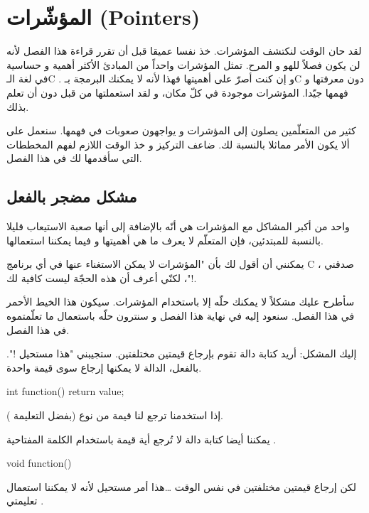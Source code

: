 \chapter{المؤشّرات (\textenglish{Pointers})}

لقد حان الوقت لنكتشف المؤشرات. خذ نفسا عميقا قبل أن تقرر قراءة هذا الفصل لأنه لن يكون فصلاً للهو و المرح. تمثل المؤشرات واحداً من المبادئ الأكثر أهمية و حساسية في لغة الـ\textenglish{C}
. و إن كنت أصرّ على أهميتها فهذا  لأنه لا يمكنك البرمجة بـ\textenglish{C}
دون معرفتها و فهمها جيّدا. المؤشرات موجودة في كلّ مكان، و لقد استعملتها من قبل دون أن تعلم بذلك.

كثير من المتعلّمين يصلون إلى المؤشرات و يواجهون صعوبات في فهمها. سنعمل على ألا يكون الأمر مماثلا بالنسبة لك. ضاعف التركيز و خذ الوقت اللازم لفهم المخططات التي سأقدمها لك في هذا الفصل.

\section{مشكل مضجر بالفعل}

واحد من أكبر المشاكل مع المؤشرات هي أنّه بالإضافة إلى أنها صعبة الاستيعاب قليلا بالنسبة للمبتدئين، فإن المتعلّم لا يعرف ما هي أهميتها و فيما يمكننا استعمالها.

يمكنني أن أقول لك بأن "المؤشرات لا يمكن الاستغناء عنها في أي برنامج
\textenglish{C}
، صدقني !"، لكنّي أعرف أن هذه الحجّة ليست كافية لك.

سأطرح عليك مشكلاً لا يمكنك حلّه إلا باستخدام المؤشرات. سيكون هذا الخيط الأحمر في هذا الفصل. سنعود إليه في نهاية هذا الفصل و سنترون حلّه باستعمال ما تعلّمتموه في هذا الفصل.

إليك المشكل: أريد كتابة دالة تقوم بإرجاع قيمتين مختلفتين. ستجيبني "هذا مستحيل !". بالفعل، الدالة لا يمكنها إرجاع سوى قيمة واحدة.

\begin{Csource}
int function()
{
	return value;
}
\end{Csource}

إذا استخدمنا
ترجع لنا قيمة من نوع
(بفضل التعليمة
).

يمكننا أيضا كتابة دالة لا تُرجع أية قيمة باستخدام الكلمة المفتاحية
.

\begin{Csource}
void function()
{

}
\end{Csource}

لكن إرجاع قيمتين مختلفتين في نفس الوقت \dots هذا أمر مستحيل لأنه لا يمكننا استعمال تعليمتي
.

